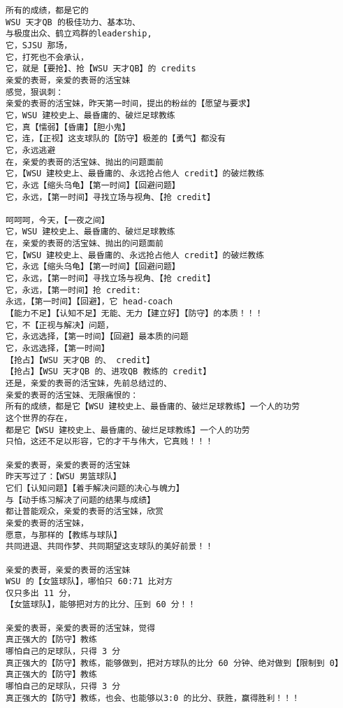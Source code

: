 \documentclass[9pt, b5paper]{article}
\begin{document}
\begin{verbatim}
所有的成绩，都是它的
WSU 天才QB 的极佳功力、基本功、
与极度出众、鹤立鸡群的leadership,
它，SJSU 那场，
它，打死也不会承认，
它，就是【要抢】、抢【WSU 天才QB】的 credits
亲爱的表哥，亲爱的表哥的活宝妹
感觉，狠讽刺：
亲爱的表哥的活宝妹，昨天第一时间，提出的粉丝的【愿望与要求】
它，WSU 建校史上、最昏庸的、破烂足球教练
它，真【懦弱】【昏庸】【胆小鬼】
它，连，【正视】这支球队的【防守】极差的【勇气】都没有
它，永远逃避
在，亲爱的表哥的活宝妹、抛出的问题面前
它，【WSU 建校史上、最昏庸的、永远抢占他人 credit】的破烂教练
它，永远【缩头乌龟】【第一时间】【回避问题】
它，永远，【第一时间】寻找立场与视角、【抢 credit】

呵呵呵，今天，【一夜之间】
它，WSU 建校史上、最昏庸的、破烂足球教练
在，亲爱的表哥的活宝妹、抛出的问题面前
它，【WSU 建校史上、最昏庸的、永远抢占他人 credit】的破烂教练
它，永远【缩头乌龟】【第一时间】【回避问题】
它，永远，【第一时间】寻找立场与视角、【抢 credit】
它，永远，【第一时间】抢 credit:
永远，【第一时间】【回避】，它 head-coach
【能力不足】【认知不足】无能、无力【建立好】【防守】的本质！！！
它，不【正视与解决】问题，
它，永远选择，【第一时间】【回避】最本质的问题
它，永远选择，【第一时间】
【抢占】【WSU 天才QB 的、 credit】
【抢占】【WSU 天才QB 的、进攻QB 教练的 credit】
还是，亲爱的表哥的活宝妹，先前总结过的、
亲爱的表哥的活宝妹、无限痛恨的：
所有的成绩，都是它【WSU 建校史上、最昏庸的、破烂足球教练】一个人的功劳
这个世界的存在，
都是它【WSU 建校史上、最昏庸的、破烂足球教练】一个人的功劳
只怕，这还不足以形容，它的才干与伟大，它真贱！！！

亲爱的表哥，亲爱的表哥的活宝妹
昨天写过了：【WSU 男篮球队】
它们【认知问题】【着手解决问题的决心与魄力】
与【动手练习解决了问题的结果与成绩】
都让普能观众，亲爱的表哥的活宝妹，欣赏
亲爱的表哥的活宝妹，
愿意，与那样的【教练与球队】
共同进退、共同作梦、共同期望这支球队的美好前景！！

亲爱的表哥，亲爱的表哥的活宝妹
WSU 的【女篮球队】，哪怕只 60:71 比对方
仅只多出 11 分，
【女篮球队】，能够把对方的比分、压到 60 分！！

亲爱的表哥，亲爱的表哥的活宝妹，觉得
真正强大的【防守】教练
哪怕自己的足球队，只得 3 分
真正强大的【防守】教练，能够做到，把对方球队的比分 60 分钟、绝对做到【限制到 0】
真正强大的【防守】教练
哪怕自己的足球队，只得 3 分
真正强大的【防守】教练，也会、也能够以3:0 的比分、获胜，赢得胜利！！！


\end{verbatim}
\end{document}
